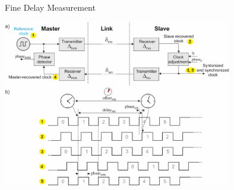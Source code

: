 \documentclass[compress,red]{beamer}
\begin{document}
\subsection{}
\begin{frame}{Fine Delay Measurement}

  \begin{center}
  \includegraphics[width=10.0cm]{protocol/link_model.pdf}
  \end{center}

\end{frame}
\end{document}
